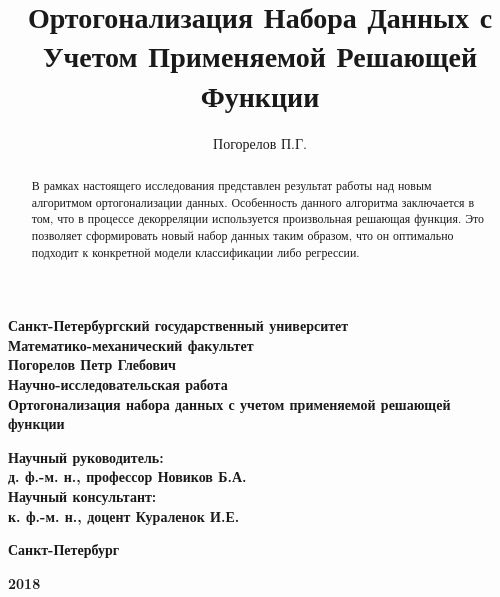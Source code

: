 \documentclass[runningheads]{llncs}
\begin{document}
\begin{titlepage}
\begin{center}
\textbf{\large Санкт-Петербургский государственный университет} \\[0.8cm]
\textbf{\large Математико-механический факультет} \\[6.0cm]

\textbf{\LARGE Погорелов Петр Глебович}\\[1.0cm]
\textbf{\Large Научно-исследовательская работа} \\[0.4cm]
 \textbf{\Large Ортогонализация набора данных с учетом применяемой решающей функции} \\[5.0cm]

\begin{flushright} \large
\textbf{Научный руководитель:} \\
\textbf{д. ф.-м. н., профессор Новиков Б.А.} \\
\textbf{Научный консультант:} \\
\textbf{к. ф.-м. н., доцент Кураленок И.Е.}
\end{flushright}
\vfill

{\large \textbf{{Санкт-Петербург}}} \par
{\large \textbf{{2018}}}
\end{center}
\end{titlepage}
\newpage

%
\title{Ортогонализация Набора Данных с Учетом Применяемой Решающей Функции}
%
%
\author{Погорелов П.Г.}
%
%
%
\maketitle              %
%
\begin{abstract}
В рамках настоящего исследования представлен результат работы над новым алгоритмом ортогонализации данных. Особенность данного алгоритма заключается в том, что в процессе декорреляции используется произвольная решающая функция. Это позволяет сформировать новый набор данных таким образом, что он оптимально подходит к конкретной модели классификации либо регрессии.

\end{abstract}
%
%
%
\end{document}
